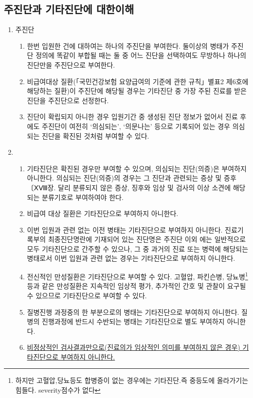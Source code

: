 \subsection{주진단과 기타진단에 대한이해}
\begin{enumerate}[가.]\tightlist
\item 주진단
	\begin{enumerate}[(1)]\tightlist
	\item 한번 입원한 건에 대하여는 하나의 주진단을 부여한다. 둘이상의 병태가 주진단 정의에 똑같이 부합될 때는 둘 중 어느 진단을 선택하여도 무방하나 하나의 진단만을 주진단으로 부여한다.
	\item 비급여대상 질환(「국민건강보험 요양급여의 기준에 관한 규칙」별표2 제6호에 해당하는 질환)이 주진단에 해당될 경우는 기타진단 중 가장 주된 진료를 받은 진단을 주진단으로 선정한다.
	\item 진단이 확립되지 아니한 경우  입원기간 중 생성된 진단 정보가 없어서 진료 후에도 주진단이 여전히 ‘의심되는’, ‘의문나는’ 등으로 기록되어 있는 경우 의심되는 진단을 확진된 것처럼 부여할 수 있다.
	\end{enumerate}

\item {}
\begin{enumerate}[(1)]\tightlist
\item {} 기타진단은 확진된 경우만 부여할 수 있으며, 의심되는 진단(의증)은 부여하지 아니한다. 의심되는 진단(의증)의 경우는 그 진단과 관련되는 증상 및 증후〔ⅩⅧ장. 달리 분류되지 않은 증상, 징후와 임상 및 검사의 이상 소견에 해당되는 분류기호로 부여하여야 한다.
\item 비급여 대상 질환은 기타진단으로 부여하지 아니한다.
\item 이번 입원과 관련 없는 이전 병태는 기타진단으로 부여하지 아니한다. 진료기록부의 최종진단명란에 기재되어 있는 진단명은 주진단 이외 에는 일반적으로 모두 기타진단으로 간주할 수 있으나, 그 중 과거의 진료 또는 병력에 해당되는 병태로서 이번 입원과 관련 없는 경우는 기타진단으로 부여하지 아니한다.
\item 전신적인 만성질환은 기타진단으로 부여할 수 있다. 고혈압, 파킨슨병, 당뇨병\footnote{하지만 고혈압,당뇨등도 합병증이 없는 경우에는 기타진단.즉 중등도에 올라가기는 힘들다. severity점수가 없다} 등과 같은 만성질환은 지속적인 임상적 평가, 추가적인 간호 및 관찰이 요구될 수 있으므로 기타진단으로 부여할 수 있다.
\item 질병진행 과정중의 한 부분으로의 병태는 기타진단으로 부여하지 아니한다. 질병의 진행과정에 반드시 수반되는 병태는 기타진단으로 별도 부여하지 아니한다.
\item \uline{비정상적인 검사결과만으로(진료의가 임상적인 의미를 부여하지 않은 경우) 기타진단으로 부여하지 아니한다.}
\end{enumerate}
\end{enumerate}
